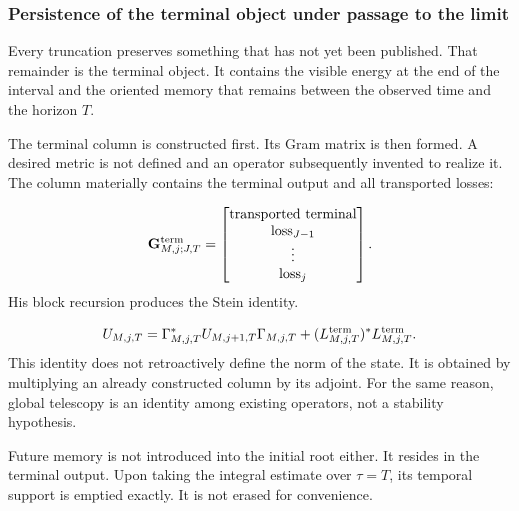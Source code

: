 \subsubsection{Persistence of the terminal object under passage to the limit}
Every truncation preserves something that has not yet been published. That remainder is the terminal object. It contains the visible energy at the end of the interval and the oriented memory that remains between the observed time and the horizon \(T\).\par
The terminal column is constructed first. Its Gram matrix is then formed. A desired metric is not defined and an operator subsequently invented to realize it. The column materially contains the terminal output and all transported losses:\par
\[
\mathbf G_{M,j;J,T}^{\rm term}
=
\begin{bmatrix}
\text{transported terminal}\\
\text{loss}_{J-1}\\
\vdots\\
\text{loss}_{j}
\end{bmatrix}.
\]
His block recursion produces the Stein identity.\par
\[
U_{M,j,T}
=
\Gamma_{M,j,T}^{*}
U_{M,j+1,T}
\Gamma_{M,j,T}
+
(L_{M,j,T}^{\rm term})^{*}
L_{M,j,T}^{\rm term}.
\]
This identity does not retroactively define the norm of the state. It is obtained by multiplying an already constructed column by its adjoint. For the same reason, global telescopy is an identity among existing operators, not a stability hypothesis.\par
Future memory is not introduced into the initial root either. It resides in the terminal output. Upon taking the integral estimate over \(\tau=T\), its temporal support is emptied exactly. It is not erased for convenience.\par
{}
